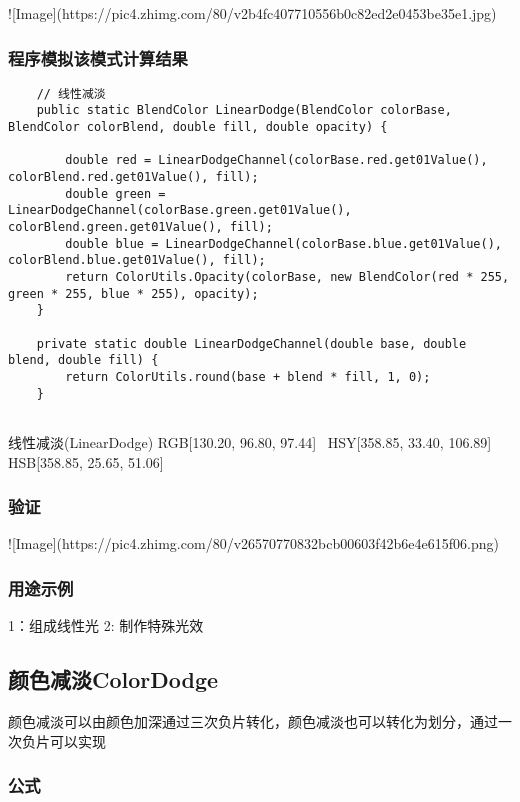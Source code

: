 ![Image](https://pic4.zhimg.com/80/v2b4fc407710556b0c82ed2e0453be35e1.jpg)

\subsubsection{ 程序模拟该模式计算结果}

\begin{lstlisting}
	// 线性减淡
	public static BlendColor LinearDodge(BlendColor colorBase, BlendColor colorBlend, double fill, double opacity) {
		
		double red = LinearDodgeChannel(colorBase.red.get01Value(), colorBlend.red.get01Value(), fill);
		double green = LinearDodgeChannel(colorBase.green.get01Value(), colorBlend.green.get01Value(), fill);
		double blue = LinearDodgeChannel(colorBase.blue.get01Value(), colorBlend.blue.get01Value(), fill);
		return ColorUtils.Opacity(colorBase, new BlendColor(red * 255, green * 255, blue * 255), opacity);
	}
	
	private static double LinearDodgeChannel(double base, double blend, double fill) {
		return ColorUtils.round(base + blend * fill, 1, 0);
	}
	
\end{lstlisting}



线性减淡(LinearDodge)   RGB[130.20,  96.80,  97.44]~ HSY[358.85,  33.40, 106.89]~ HSB[358.85,  25.65,  51.06]


\subsubsection{ 验证}

![Image](https://pic4.zhimg.com/80/v26570770832bcb00603f42b6e4e615f06.png)

\subsubsection{ 用途示例}

1：组成线性光
2: 制作特殊光效

\subsection{ 颜色减淡ColorDodge}

颜色减淡可以由颜色加深通过三次负片转化，颜色减淡也可以转化为划分，通过一次负片可以实现

\subsubsection{ 公式}

